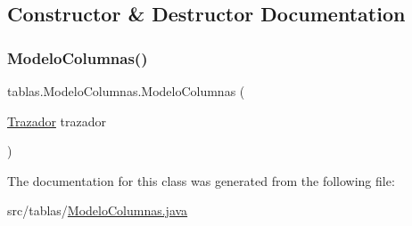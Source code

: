 \subsection{Constructor \& Destructor Documentation}
\mbox{\label{classtablas_1_1_modelo_columnas_a52fadcf02ccc30520130e4a7a4b827f9}} 
\subsubsection{\texorpdfstring{Modelo\+Columnas()}{ModeloColumnas()}}
{\footnotesize\ttfamily tablas.\+Modelo\+Columnas.\+Modelo\+Columnas (\begin{DoxyParamCaption}\item[{\mbox{\hyperlink{classtablas_1_1_panel_tablas_1_1_trazador}{Trazador}}}]{trazador }\end{DoxyParamCaption})}



The documentation for this class was generated from the following file\+:\begin{DoxyCompactItemize}
\item 
src/tablas/\mbox{\hyperlink{_modelo_columnas_8java}{Modelo\+Columnas.\+java}}\end{DoxyCompactItemize}
